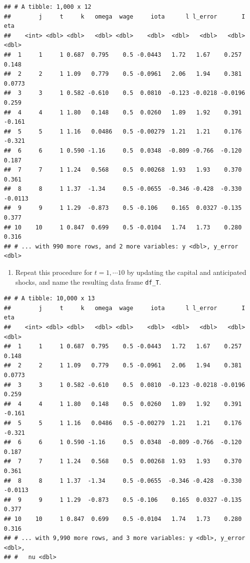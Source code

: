 \documentclass[]{book}
\providecommand{\tightlist}{%
  \setlength{\itemsep}{0pt}\setlength{\parskip}{0pt}}
\begin{document}
\begin{verbatim}
## # A tibble: 1,000 x 12
##        j     t     k   omega  wage     iota      l l_error       I     eta
##    <int> <dbl> <dbl>   <dbl> <dbl>    <dbl>  <dbl>   <dbl>   <dbl>   <dbl>
##  1     1     1 0.687  0.795    0.5 -0.0443   1.72   1.67    0.257   0.148 
##  2     2     1 1.09   0.779    0.5 -0.0961   2.06   1.94    0.381   0.0773
##  3     3     1 0.582 -0.610    0.5  0.0810  -0.123 -0.0218 -0.0196  0.259 
##  4     4     1 1.80   0.148    0.5  0.0260   1.89   1.92    0.391  -0.161 
##  5     5     1 1.16   0.0486   0.5 -0.00279  1.21   1.21    0.176  -0.321 
##  6     6     1 0.590 -1.16     0.5  0.0348  -0.809 -0.766  -0.120   0.187 
##  7     7     1 1.24   0.568    0.5  0.00268  1.93   1.93    0.370   0.361 
##  8     8     1 1.37  -1.34     0.5 -0.0655  -0.346 -0.428  -0.330  -0.0113
##  9     9     1 1.29  -0.873    0.5 -0.106    0.165  0.0327 -0.135   0.377 
## 10    10     1 0.847  0.699    0.5 -0.0104   1.74   1.73    0.280   0.316 
## # ... with 990 more rows, and 2 more variables: y <dbl>, y_error <dbl>
\end{verbatim}

\begin{enumerate}
\def\labelenumi{\arabic{enumi}.}
\setcounter{enumi}{8}
\tightlist
\item
  Repeat this procedure for \(t = 1, \cdots 10\) by updating the capital
  and anticipated shocks, and name the resulting data frame
  \texttt{df\_T}.
\end{enumerate}

\begin{verbatim}
## # A tibble: 10,000 x 13
##        j     t     k   omega  wage     iota      l l_error       I     eta
##    <int> <dbl> <dbl>   <dbl> <dbl>    <dbl>  <dbl>   <dbl>   <dbl>   <dbl>
##  1     1     1 0.687  0.795    0.5 -0.0443   1.72   1.67    0.257   0.148 
##  2     2     1 1.09   0.779    0.5 -0.0961   2.06   1.94    0.381   0.0773
##  3     3     1 0.582 -0.610    0.5  0.0810  -0.123 -0.0218 -0.0196  0.259 
##  4     4     1 1.80   0.148    0.5  0.0260   1.89   1.92    0.391  -0.161 
##  5     5     1 1.16   0.0486   0.5 -0.00279  1.21   1.21    0.176  -0.321 
##  6     6     1 0.590 -1.16     0.5  0.0348  -0.809 -0.766  -0.120   0.187 
##  7     7     1 1.24   0.568    0.5  0.00268  1.93   1.93    0.370   0.361 
##  8     8     1 1.37  -1.34     0.5 -0.0655  -0.346 -0.428  -0.330  -0.0113
##  9     9     1 1.29  -0.873    0.5 -0.106    0.165  0.0327 -0.135   0.377 
## 10    10     1 0.847  0.699    0.5 -0.0104   1.74   1.73    0.280   0.316 
## # ... with 9,990 more rows, and 3 more variables: y <dbl>, y_error <dbl>,
## #   nu <dbl>
\end{verbatim}
\end{document}
